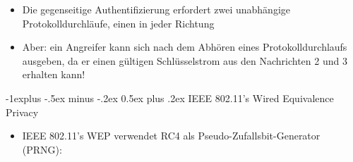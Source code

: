 \documentclass[a4paper]{article}
\makeatletter
\renewcommand{\subsection}{\@startsection{subsection}{2}{0mm}%
 {-1explus -.5ex minus -.2ex}%
 {0.5ex plus .2ex}%
 {\normalfont\normalsize\bfseries}}
\makeatother
\begin{document}
\begin{multicols}{3}
\begin{itemize}
              \begin{enumerate}
                  \def\labelenumi{\arabic{enumi}.}
                  \item
                        \$A \textbackslash rightarrow B: (Authentifizierung, 1, ID\_A)\$
                  \item
                        \$B \textbackslash rightarrow A: (Authentifizierung, 2, r\_B)\$
                  \item
                        \$A \textbackslash rightarrow B: \{Authentifizierung, 3,
                        r\_B\}\emph{\{K}\{A,B\}\}\$
                  \item
                        \$B \textbackslash rightarrow A: (Authentifizierung, 4,
                        erfolgreich)\$
              \end{enumerate}
        \item
              Die gegenseitige Authentifizierung erfordert zwei unabhängige
              Protokolldurchläufe, einen in jeder Richtung
        \item
              Aber: ein Angreifer kann sich nach dem Abhören eines
              Protokolldurchlaufs ausgeben, da er einen gültigen Schlüsselstrom aus
              den Nachrichten 2 und 3 erhalten kann!
    \end{itemize}


    \subsection{IEEE 802.11's Wired Equivalence
        Privacy}

    \begin{itemize}
        \item
              IEEE 802.11's WEP verwendet RC4 als Pseudo-Zufallsbit-Generator
              (PRNG):


\end{itemize}
\end{multicols}
\end{document}
